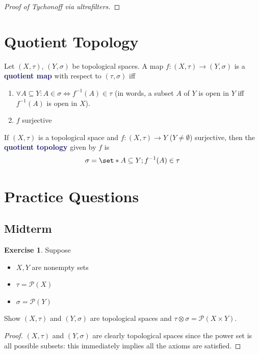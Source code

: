 \documentclass[11pt]{article}
\numberwithin{equation}{section}
\newcommand{\navy}[1]{\textcolor{MidnightBlue}{\bf #1}}
\newcounter{theo}[section]\setcounter{theo}{0}
\theoremstyle{definition}
\theoremstyle{definition}
\newtheorem{exercise}{\color{YellowOrange}Exercise}[section]
\newcommand\inv[1]{#1^{-1}}
\def\Set{\set*}%
\def\sse{\subseteq}
\newcommand{\1}{\mathbbm 1}
\def\t{\tau}
\newcommand{\pP}{\mathcal P}
\begin{document}
\begin{proof}[Proof of Tychonoff via ultrafilters]


\end{proof}

\section{Quotient Topology}

\begin{definition}
	Let $(X,\t)$, $(Y,\sigma)$ be topological spaces. A map $f: (X,\t) \to (Y,\sigma)$ is a \navy{quotient map} with respect to $(\t,\sigma)$ iff
	\begin{enumerate}
		\item $\forall A \sse Y: A \in \sigma \iff \inv{f}(A) \in \t$ (in words, a subset $A$ of $Y$ is open in $Y$ iff $\inv{f}(A)$ is open in $X$).
		\item $f$ surjective
	\end{enumerate}
\end{definition}

\begin{definition}
	If $(X,\t)$ is a topological space and $f:(X,\t) \to Y$ ($Y \neq \emptyset$) surjective, then the \navy{quotient topology} given by $f$ is
	\begin{equation}
		\sigma = \Set{A \sse Y; \inv{f}(A) \in \t}
	\end{equation}
\end{definition}



\newpage
\section{Practice Questions}

\subsection{Midterm}

\begin{exercise}
	Suppose 
	\begin{itemize}
		\item $X,Y$ are nonempty sets
		\item $\t = \pP(X)$
		\item $\sigma = \pP(Y)$
	\end{itemize}
	Show $(X,\t)$ and $(Y,\sigma)$ are topological spaces and $\t \otimes \sigma = \pP(X \times Y)$. 
\end{exercise}
\begin{proof}
	$(X,\t)$ and $(Y,\sigma)$ are clearly topological spaces since the power set is all possible subsets: this immediately implies all the axioms are satisfied. 
\end{proof}
\end{document}
